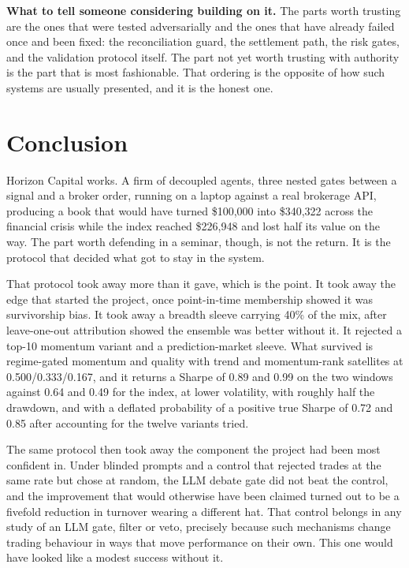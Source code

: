 \documentclass[10pt,twocolumn]{IEEEtran}
\begin{document}
\textbf{What to tell someone considering building on it.} The parts worth
trusting are the ones that were tested adversarially and the ones that have
already failed once and been fixed: the reconciliation guard, the settlement
path, the risk gates, and the validation protocol itself. The part not yet
worth trusting with authority is the part that is most fashionable. That
ordering is the opposite of how such systems are usually presented, and it is
the honest one.

\section{Conclusion}

Horizon Capital works. A firm of decoupled agents, three nested gates between a
signal and a broker order, running on a laptop against a real brokerage API,
producing a book that would have turned \$100{,}000 into \$340{,}322 across the
financial crisis while the index reached \$226{,}948 and lost half its value on
the way. The part worth defending in a seminar, though, is not the return. It
is the protocol that decided what got to stay in the system.

That protocol took away more than it gave, which is the point. It took away the
edge that started the project, once point-in-time membership showed it was
survivorship bias. It took away a breadth sleeve carrying 40\% of the mix,
after leave-one-out attribution showed the ensemble was better without it. It
rejected a top-10 momentum variant and a prediction-market sleeve. What
survived is regime-gated momentum and quality with trend and momentum-rank
satellites at 0.500/0.333/0.167, and it returns a Sharpe of 0.89 and 0.99 on
the two windows against 0.64 and 0.49 for the index, at lower volatility, with
roughly half the drawdown, and with a deflated probability of a positive true
Sharpe of 0.72 and 0.85 after accounting for the twelve variants tried.

The same protocol then took away the component the project had been most
confident in. Under blinded prompts and a control that rejected trades at the
same rate but chose at random, the LLM debate gate did not beat the control,
and the improvement that would otherwise have been claimed turned out to be a
fivefold reduction in turnover wearing a different hat. That control belongs in
any study of an LLM gate, filter or veto, precisely because such mechanisms
change trading behaviour in ways that move performance on their own. This one
would have looked like a modest success without it.
\end{document}
